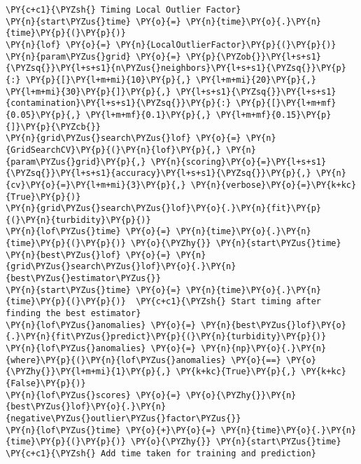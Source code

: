 \begin{tcolorbox}[breakable, size=fbox, boxrule=1pt, pad at break*=1mm,colback=cellbackground, colframe=cellborder]
\begin{Verbatim}[commandchars=\\\{\}]
\PY{c+c1}{\PYZsh{} Timing Local Outlier Factor}
\PY{n}{start\PYZus{}time} \PY{o}{=} \PY{n}{time}\PY{o}{.}\PY{n}{time}\PY{p}{(}\PY{p}{)}
\PY{n}{lof} \PY{o}{=} \PY{n}{LocalOutlierFactor}\PY{p}{(}\PY{p}{)}
\PY{n}{param\PYZus{}grid} \PY{o}{=} \PY{p}{\PYZob{}}\PY{l+s+s1}{\PYZsq{}}\PY{l+s+s1}{n\PYZus{}neighbors}\PY{l+s+s1}{\PYZsq{}}\PY{p}{:} \PY{p}{[}\PY{l+m+mi}{10}\PY{p}{,} \PY{l+m+mi}{20}\PY{p}{,} \PY{l+m+mi}{30}\PY{p}{]}\PY{p}{,} \PY{l+s+s1}{\PYZsq{}}\PY{l+s+s1}{contamination}\PY{l+s+s1}{\PYZsq{}}\PY{p}{:} \PY{p}{[}\PY{l+m+mf}{0.05}\PY{p}{,} \PY{l+m+mf}{0.1}\PY{p}{,} \PY{l+m+mf}{0.15}\PY{p}{]}\PY{p}{\PYZcb{}}
\PY{n}{grid\PYZus{}search\PYZus{}lof} \PY{o}{=} \PY{n}{GridSearchCV}\PY{p}{(}\PY{n}{lof}\PY{p}{,} \PY{n}{param\PYZus{}grid}\PY{p}{,} \PY{n}{scoring}\PY{o}{=}\PY{l+s+s1}{\PYZsq{}}\PY{l+s+s1}{accuracy}\PY{l+s+s1}{\PYZsq{}}\PY{p}{,} \PY{n}{cv}\PY{o}{=}\PY{l+m+mi}{3}\PY{p}{,} \PY{n}{verbose}\PY{o}{=}\PY{k+kc}{True}\PY{p}{)}
\PY{n}{grid\PYZus{}search\PYZus{}lof}\PY{o}{.}\PY{n}{fit}\PY{p}{(}\PY{n}{turbidity}\PY{p}{)}
\PY{n}{lof\PYZus{}time} \PY{o}{=} \PY{n}{time}\PY{o}{.}\PY{n}{time}\PY{p}{(}\PY{p}{)} \PY{o}{\PYZhy{}} \PY{n}{start\PYZus{}time}
\PY{n}{best\PYZus{}lof} \PY{o}{=} \PY{n}{grid\PYZus{}search\PYZus{}lof}\PY{o}{.}\PY{n}{best\PYZus{}estimator\PYZus{}}
\PY{n}{start\PYZus{}time} \PY{o}{=} \PY{n}{time}\PY{o}{.}\PY{n}{time}\PY{p}{(}\PY{p}{)}  \PY{c+c1}{\PYZsh{} Start timing after finding the best estimator}
\PY{n}{lof\PYZus{}anomalies} \PY{o}{=} \PY{n}{best\PYZus{}lof}\PY{o}{.}\PY{n}{fit\PYZus{}predict}\PY{p}{(}\PY{n}{turbidity}\PY{p}{)}
\PY{n}{lof\PYZus{}anomalies} \PY{o}{=} \PY{n}{np}\PY{o}{.}\PY{n}{where}\PY{p}{(}\PY{n}{lof\PYZus{}anomalies} \PY{o}{==} \PY{o}{\PYZhy{}}\PY{l+m+mi}{1}\PY{p}{,} \PY{k+kc}{True}\PY{p}{,} \PY{k+kc}{False}\PY{p}{)}
\PY{n}{lof\PYZus{}scores} \PY{o}{=} \PY{o}{\PYZhy{}}\PY{n}{best\PYZus{}lof}\PY{o}{.}\PY{n}{negative\PYZus{}outlier\PYZus{}factor\PYZus{}}
\PY{n}{lof\PYZus{}time} \PY{o}{+}\PY{o}{=} \PY{n}{time}\PY{o}{.}\PY{n}{time}\PY{p}{(}\PY{p}{)} \PY{o}{\PYZhy{}} \PY{n}{start\PYZus{}time}  \PY{c+c1}{\PYZsh{} Add time taken for training and prediction}


\end{Verbatim}
\end{tcolorbox}
